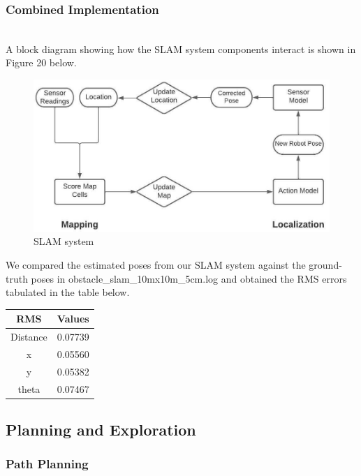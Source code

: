 \documentclass[journal]{IEEEtran}
\begin{document}
\subsubsection{Combined Implementation}  \hfill\\

A block diagram showing how the SLAM system components interact is shown in Figure 20 below.\\

\begin{figure}[h]
\begin{center}
\includegraphics[width=1\linewidth]{image_2/figure_2_3_1.jpg}
\end{center}
   \caption{SLAM system}
   \label{figure_2_3_1}
\end{figure}
\newpage
We compared the estimated poses from our SLAM system against the ground-truth poses in obstacle\_slam\_10mx10m\_5cm.log and obtained the RMS errors tabulated in the table below.

\begin{center}
\begin{tabular}{ |c|c| } 
 \hline
 \textbf{RMS} & \textbf{Values} \\ 
 \hline
 Distance & 0.07739 \\ 
 \hline
 x & 0.05560 \\ 
 \hline
 y & 0.05382 \\
 \hline
 theta & 0.07467 \\
 \hline
\end{tabular}
\end{center}


\subsection{Planning and Exploration}

\subsubsection{Path Planning} \hfill\\
\end{document}
